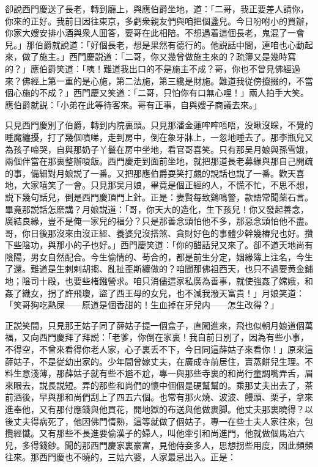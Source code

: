 卻說西門慶送了長老，轉到廳上，與應伯爵坐地，道：「二哥，我正要差人請你，你來的正好。我前日因往東京，多虧衆親友們與咱把個盞兒。今日吩咐小的買辦，你家大嫂安排小酒與衆人囬答，要哥在此相陪。不想遇着這個長老，鬼混了一會兒。」那伯爵就說道：「好個長老，想是果然有德行的。他説話中間，連咱也心動起來，做了施主。」西門慶説道：「二哥，你又幾曾做施主來的？疏簿又是幾時寫的？」應伯爵笑道：「咦！難道我出口的不是施主不成？哥，你也不曾見佛經過來？佛經上第一重的是心施，第二法施，第三纔是財施。難道我従傍攛掇的，不當個心施的不成？」西門慶又笑道：「二哥，只怕你有口無心哩！」兩人拍手大笑。應伯爵就説：「小弟在此等待客來。哥有正事，自與嫂子商議去來。」

只見西門慶別了伯爵，轉到内院裏頭。只見那潘金蓮哰哰唔唔，没瞅沒睬，不覺的睡魔纏擾，打了幾個噴㖒，走到房中，倒在象牙牀上，一忽地睡去了。那李瓶兒又為孩子啼哭，自與那奶子丫鬟在房中坐地，看官哥喜笑。只有那吴月娘與孫雪娥，兩個伴當在那裏整辦嗄飯。西門慶走到面前坐地，就把那道長老募緣與那自己開疏的事，備細對月娘説了一番。又把那應伯爵耍笑打覷的說話也説了一番。歡天喜地，大家嘻笑了一會。只見那吴月娘，畢竟是個正經的人，不慌不忙，不思不想，説下幾句話兒，倒是西門慶頂門上針。正是：妻賢每致鷄鳴警，款語常聞薬石言。畢竟那説話怎麽講？月娘説道：「哥，你天大的造化，生下孩兒！你又發起善念，廣結良緣，豈不是俺一家兒的福分？只是那善念頭怕他不多，那惡念頭怕他不盡。哥，你日後那沒來由沒正經、養婆兒沒搭煞、貪財好色的事體少幹幾樁兒也好。攢下些陰功，與那小的子也好。」西門慶笑道：「你的醋話兒又來了。卻不道天地尚有陰陽，男女自然配合。今生偷情的、苟合的，都是前生分定，姻緣簿上注名，今生了還。難道是生剌剌胡搊、亂扯歪斯纏做的？咱聞那佛祖西天，也只不過要黄金鋪地；陰司十殿，也要些楮鏹營求。咱只消儘這家私廣為善事，就使強姦了嫦娥，和姦了織女，拐了許飛瓊，盜了西王母的女兒，也不減我潑天富貴！」月娘笑道：「笑哥狗吃熱屎——原道是個香甜的！生血掉在牙兒内——怎生改得？」

正説笑間，只見那王姑子同了薛姑子提一個盒子，直闖進來，飛也似朝月娘道個萬福，又向西門慶拜了拜説：「老爹，你倒在家裏！我自前日別了，因為有些小事，不得空，不曾來看得你老人家，心子裏丢不下，今日同這薛姑子來看你！」原來這薛姑子，不是従幼出家的。少年間曾嫁丈夫，在廣成寺前居住，賣蒸餅兒生理。不料生意淺薄，那薛姑子就有些不尷不尬，專一與那些寺裏的和尚行童調嘴弄舌，眉來眼去，説長説短。弄的那些和尚們的懷中個個是硬幫幫的。乘那丈夫出去了，茶前酒後，早與那和尚們刮上了四五六個。也常有那火燒、波波、饅頭、栗子，拿來進奉他，又有那付應錢與他買花，開地獄的布送與他做裹脚。他丈夫那裏曉得？以後丈夫得病死了，他因佛門情熟，這等就做了個姑子，專一在些士夫人家往來，包攬經懺。又有那些不長進要偷漢子的婦人，叫他牽引和尚進門，他就做個馬泊六兒，多得錢鈔。聞的那西門慶家裏豪富，見他侍妾多人，思想拐些用度，因此頻頻往來。那西門慶也不曉的，三姑六婆，人家最忌出入。正是：

